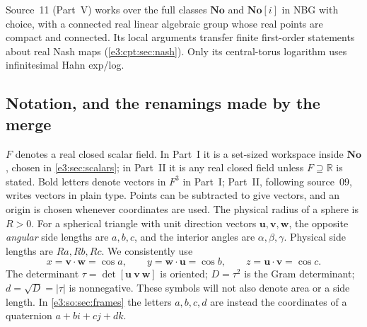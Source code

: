 \documentclass[11pt,letterpaper]{article}
\numberwithin{equation}{section}
\theoremstyle{definition}
\theoremstyle{remark}
\newcommand{\No}{\mathbf{No}}
\newcommand{\R}{\mathbb R}
\newcommand{\vv}[1]{\bm{#1}}
\begin{document}
Source~11 (Part~V) works over the full classes $\No$ and $\No[i]$ in NBG with
choice, with a connected real linear algebraic group whose real points are
compact and connected. Its local arguments transfer finite first-order
statements about real Nash maps (\cref{e3:cpt:sec:nash}). Only its central-torus
logarithm uses infinitesimal Hahn exp/log.

\subsection{Notation, and the renamings made by the merge}\label{e3:sub:notation}

$F$ denotes a real closed scalar field. In Part~I it is a set-sized workspace
inside $\No$, chosen in \cref{e3:sec:scalars}; in Part~II it is any real
closed field unless $F\supseteq\R$ is stated. Bold letters denote vectors in
$F^3$ in Part~I; Part~II, following source~09, writes vectors in plain type.
Points can be subtracted to give vectors, and an origin is chosen whenever
coordinates are used. The physical radius of a sphere is $R>0$. For a
spherical triangle with unit direction vectors $\vv u,\vv v,\vv w$, the
opposite \emph{angular} side lengths are $a,b,c$, and the interior angles are
$\alpha,\beta,\gamma$. Physical side lengths are $Ra,Rb,Rc$. We consistently use
\begin{equation}\label{e3:eq:xyzconvention}
 x=\vv v\cdot\vv w=\cos a,\qquad
 y=\vv w\cdot\vv u=\cos b,\qquad
 z=\vv u\cdot\vv v=\cos c.
\end{equation}
The determinant $\tau=\det[\vv u\ \vv v\ \vv w]$ is oriented;
$D=\tau^2$ is the Gram determinant; $d=\sqrt D=|\tau|$ is nonnegative.
These symbols will not also denote area or a side length. In
\cref{e3:so:sec:frames} the letters $a,b,c,d$ are instead the coordinates of a
quaternion $a+bi+cj+dk$.
\end{document}
